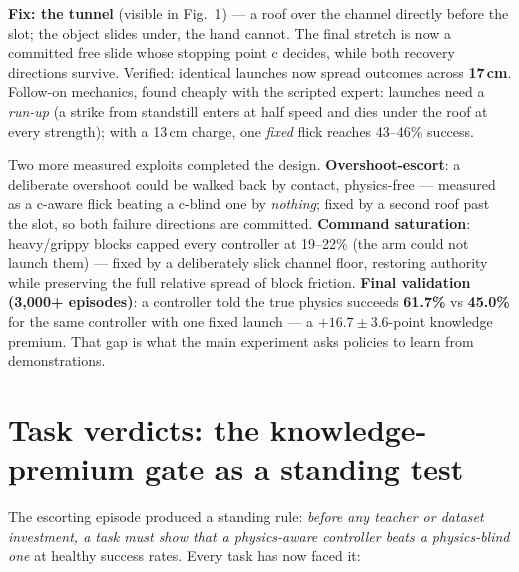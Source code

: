 \documentclass[10pt]{article}
\begin{document}
\textbf{Fix: the tunnel} (visible in Fig.~1) --- a roof over the channel directly
before the slot; the object slides under, the hand cannot. The final stretch is now
a committed free slide whose stopping point c decides, while both recovery
directions survive. Verified: identical launches now spread outcomes across
\textbf{17\,cm}. Follow-on mechanics, found cheaply with the scripted expert:
launches need a \emph{run-up} (a strike from standstill enters at half speed and
dies under the roof at every strength); with a 13\,cm charge, one \emph{fixed}
flick reaches 43--46\% success.

Two more measured exploits completed the design. \textbf{Overshoot-escort}: a
deliberate overshoot could be walked back by contact, physics-free --- measured as
a c-aware flick beating a c-blind one by \emph{nothing}; fixed by a second roof
past the slot, so both failure directions are committed. \textbf{Command
saturation}: heavy/grippy blocks capped every controller at 19--22\% (the arm
could not launch them) --- fixed by a deliberately slick channel floor, restoring
authority while preserving the full relative spread of block friction.
\textbf{Final validation (3{,}000+ episodes)}: a controller told the true physics
succeeds \textbf{61.7\%} vs \textbf{45.0\%} for the same controller with one fixed
launch --- a $+16.7\pm3.6$-point knowledge premium. That gap is what the main
experiment asks policies to learn from demonstrations.

\section{Task verdicts: the knowledge-premium gate as a standing test}
The escorting episode produced a standing rule: \emph{before any teacher or
dataset investment, a task must show that a physics-aware controller beats a
physics-blind one} at healthy success rates. Every task has now faced it:
\end{document}
